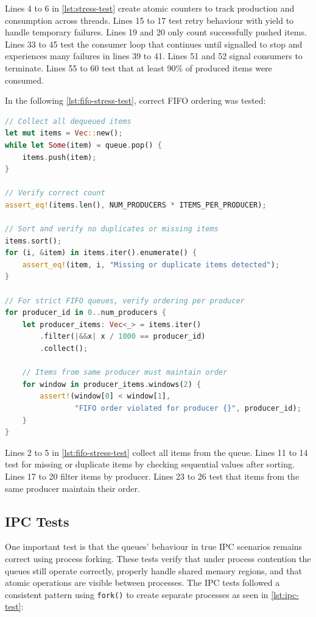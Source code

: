 Lines 4 to 6 in \cref{lst:stress-test} create atomic counters to track production and consumption across threads. Lines 15 to 17 test retry behaviour with yield to handle temporary failures. Lines 19 and 20 only count successfully pushed items. Lines 33 to 45 test the consumer loop that continues until signalled to stop and experiences many failures in lines 39 to 41. Lines 51 and 52 signal consumers to terminate. Lines 55 to 60 test that at least 90\% of produced items were consumed.

In the following \cref{lst:fifo-stress-test}, correct \ac{FIFO} ordering was tested:

\begin{lstlisting}[language=Rust, style=boxed, caption={FIFO ordering verification under stress}, label={lst:fifo-stress-test}]
// Collect all dequeued items
let mut items = Vec::new();
while let Some(item) = queue.pop() {
    items.push(item);
}

// Verify correct count
assert_eq!(items.len(), NUM_PRODUCERS * ITEMS_PER_PRODUCER);

// Sort and verify no duplicates or missing items
items.sort();
for (i, &item) in items.iter().enumerate() {
    assert_eq!(item, i, "Missing or duplicate items detected");
}

// For strict FIFO queues, verify ordering per producer
for producer_id in 0..num_producers {
    let producer_items: Vec<_> = items.iter()
        .filter(|&&x| x / 1000 == producer_id)
        .collect();
    
    // Items from same producer must maintain order
    for window in producer_items.windows(2) {
        assert!(window[0] < window[1], 
                "FIFO order violated for producer {}", producer_id);
    }
}
\end{lstlisting}

Lines 2 to 5 in \cref{lst:fifo-stress-test} collect all items from the queue. Lines 11 to 14 test for missing or duplicate items by checking sequential values after sorting. Lines 17 to 20 filter items by producer. Lines 23 to 26 test that items from the same producer maintain their order.

\subsection{\acf{IPC} Tests}
One important test is that the queues' behaviour in true \ac{IPC} scenarios remains correct using process forking. These tests verify that under process contention the queues still operate correctly, properly handle shared memory regions, and that atomic operations are visible between processes. The \ac{IPC} tests followed a consistent pattern using \texttt{fork()} to create separate processes as seen in \cref{lst:ipc-test}:

